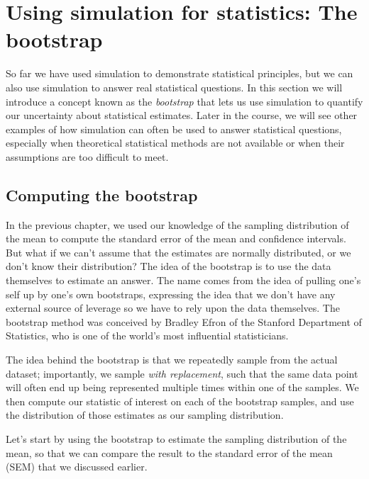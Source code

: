 \documentclass[12pt,]{book}
\theoremstyle{definition}
\theoremstyle{definition}
\theoremstyle{definition}
\theoremstyle{remark}
\begin{document}
\hypertarget{using-simulation-for-statistics-the-bootstrap}{%
\section{Using simulation for statistics: The bootstrap}\label{using-simulation-for-statistics-the-bootstrap}}

So far we have used simulation to demonstrate statistical principles, but we can also use simulation to answer real statistical questions. In this section we will introduce a concept known as the \emph{bootstrap} that lets us use simulation to quantify our uncertainty about statistical estimates. Later in the course, we will see other examples of how simulation can often be used to answer statistical questions, especially when theoretical statistical methods are not available or when their assumptions are too difficult to meet.

\hypertarget{computing-the-bootstrap}{%
\subsection{Computing the bootstrap}\label{computing-the-bootstrap}}

In the previous chapter, we used our knowledge of the sampling distribution of the mean to compute the standard error of the mean and confidence intervals. But what if we can't assume that the estimates are normally distributed, or we don't know their distribution? The idea of the bootstrap is to use the data themselves to estimate an answer. The name comes from the idea of pulling one's self up by one's own bootstraps, expressing the idea that we don't have any external source of leverage so we have to rely upon the data themselves. The bootstrap method was conceived by Bradley Efron of the Stanford Department of Statistics, who is one of the world's most influential statisticians.

The idea behind the bootstrap is that we repeatedly sample from the actual dataset; importantly, we sample \emph{with replacement}, such that the same data point will often end up being represented multiple times within one of the samples. We then compute our statistic of interest on each of the bootstrap samples, and use the distribution of those estimates as our sampling distribution.

Let's start by using the bootstrap to estimate the sampling distribution of the mean, so that we can compare the result to the standard error of the mean (SEM) that we discussed earlier.
\end{document}
